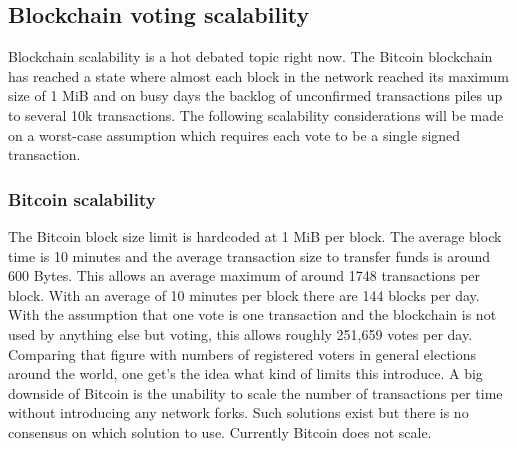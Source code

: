 \documentclass[9pt,oneside]{amsart}
\begin{document}
\begin{multicols}{2}
\subsection{Blockchain voting scalability}
Blockchain scalability is a hot debated topic right now. The Bitcoin blockchain has reached a state where almost each block in the network reached its maximum size of 1 MiB and on busy days the backlog of unconfirmed transactions piles up to several 10k transactions. The following scalability considerations will be made on a worst-case assumption which requires each vote to be a single signed transaction.
\subsubsection{Bitcoin scalability}
The Bitcoin block size limit is hardcoded at 1 MiB per block. The average block time is 10 minutes and the average transaction size to transfer funds is around 600 Bytes. This allows an average maximum of around 1748 transactions per block. With an average of 10 minutes per block there are 144 blocks per day. With the assumption that one vote is one transaction and the blockchain is not used by anything else but voting, this allows roughly 251,659 votes per day. Comparing that figure with numbers of registered voters in general elections around the world, one get's the idea what kind of limits this introduce. A big downside of Bitcoin is the unability to scale the number of transactions per time without introducing any network forks. Such solutions exist but there is no consensus on which solution to use. Currently Bitcoin does not scale.

\end{multicols}
\end{document}
